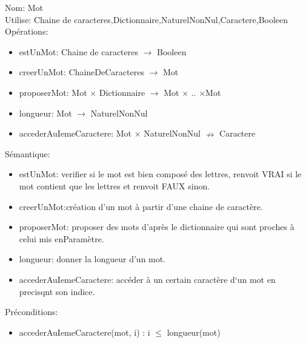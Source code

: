 \documentclass{article}
\begin{document}
    \noindent
    Nom: Mot \\
    Utilise: Chaine de caracteres,Dictionnaire,NaturelNonNul,Caractere,Booleen \\
    Opérations: \begin{itemize}[label=$\ $, leftmargin=2cm, itemsep=0cm]
        \item estUnMot: Chaine de caracteres $\rightarrow $ Booleen
        \item creerUnMot: ChaineDeCaracteres $ \rightarrow$ Mot
          
        \item proposerMot: Mot $ \times $ Dictionnaire $ \rightarrow$  Mot $ \times $ .. $ \times $Mot
        \item longueur: Mot $ \rightarrow$  NaturelNonNul
        \item accederAuIemeCaractere: Mot $ \times $ NaturelNonNul $ \nrightarrow$  Caractere
    \end{itemize}
    
    Sémantique: \begin{itemize}[label=$\- $, leftmargin=2cm, itemsep=0cm]
        \item estUnMot: verifier si le mot est bien composé des lettres, renvoit VRAI si le mot contient que les lettres et renvoit FAUX sinon.

        \item creerUnMot:création d’un mot à partir d’une chaine de caractère.
         
        \item proposerMot: proposer des mots d’après le dictionnaire qui sont proches à celui mis enParamètre.
        \item longueur: donner la longueur d’un mot.
        \item accederAuIemeCaractere: accéder à un certain caractère d`un mot en precisqnt son indice.
    \end{itemize}

    Préconditions: \begin{itemize}[label=$\- $, leftmargin=2cm, itemsep=0cm]
        \item accederAuIemeCaractere(mot, i) : i $\leq$ longueur(mot)
    \end{itemize}
\end{document}
